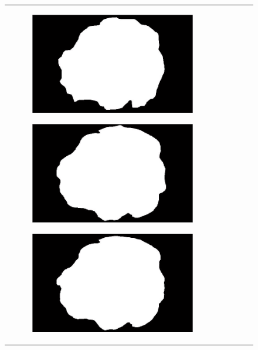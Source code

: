 \documentclass[a4paper, 10pt, conference]{ieeeconf}        %
\begin{document}
\begin{figure}[ht!]
\begin{tabular}{c c c c c}
\begin{subfigure}{0.2\textwidth}
   \end{subfigure}
   \begin{subfigure}{0.2\textwidth}
    \includegraphics[scale=0.2]{expert_2GroundTrue_06.JPG}
    \end{subfigure} 
   \begin{subfigure}{0.2\textwidth}
    \includegraphics[scale=0.2]{expert_3GroundTrue_06.JPG}
    \end{subfigure} 
   \begin{subfigure}{0.2\textwidth}
    \includegraphics[scale=0.2]{finalGroundTrue_06.JPG}

\end{subfigure}
\end{tabular}
\end{figure}
\end{document}
